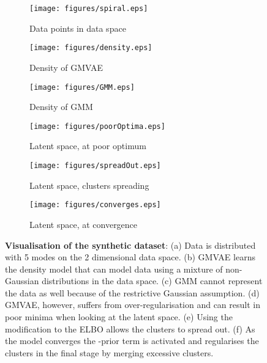 \documentclass{article} \usepackage{iclr2017_conference,times}
\begin{document}
\begin{figure}[h]
\centering
	\begin{subfigure}{.33\textwidth}
	  \centering
	  \texttt{[image: figures/spiral.eps]}
	  \caption{Data points in data space}
      \label{fig:toyData}
	\end{subfigure}\begin{subfigure}{.33\textwidth}
	  \centering
	  \texttt{[image: figures/density.eps]}
	  \caption{Density of GMVAE}
      \label{fig:gmvaeDensity}
	\end{subfigure}\begin{subfigure}{.33\textwidth}
	  \centering
	  \texttt{[image: figures/GMM.eps]}
	  \caption{Density of GMM}
	  \label{fig:gmmDensity}
	\end{subfigure}

	\begin{subfigure}{.33\textwidth}
    \centering
	  \texttt{[image: figures/poorOptima.eps]}
	  \caption{Latent space, at poor optimum}
	  \label{fig:poorOptimal}
	\end{subfigure}\begin{subfigure}{.33\textwidth}
    \centering
	  \texttt{[image: figures/spreadOut.eps]}
	  \caption{Latent space, clusters spreading}
	  \label{fig:spread}
	\end{subfigure}\begin{subfigure}{.33\textwidth}
    \centering
    \texttt{[image: figures/converges.eps]}
	  \caption{Latent space, at convergence}
	  \label{fig:converge}
	\end{subfigure}

  \caption{\textbf{Visualisation of the synthetic dataset}: (a) Data is distributed with 5 modes on the 2 dimensional data space. (b) GMVAE learns the density model that can model data using a mixture of non-Gaussian distributions in the data space. (c) GMM cannot represent the data as well because of the restrictive Gaussian assumption. (d) GMVAE, however, suffers from over-regularisation and can result in poor minima when looking at the latent space. (e) Using the modification to the ELBO \citep{kingma2016improving} allows the clusters to spread out. (f) As the model converges the -prior term is activated and regularises the clusters in the final stage by merging excessive clusters.}
  \label{fig:spiral}
\end{figure}
\end{document}
